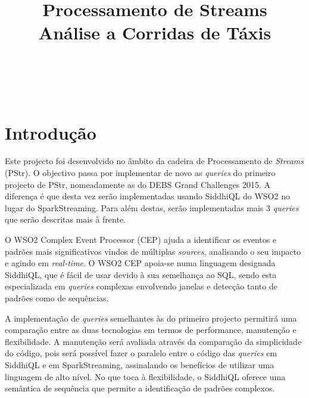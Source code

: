 \documentclass[article]{IEEEtran}
\begin{document}
\title{Processamento de Streams\\Análise a Corridas de Táxis}


\author{\\
\and
{}\\
}

\maketitle



\section{Introdução}
Este projecto foi desenvolvido no âmbito da cadeira de Processamento de \textit{Streams} (PStr). O objectivo passa por implementar de novo as \textit{queries} do primeiro projecto de PStr, nomeadamente as do  DEBS Grand Challenges 2015. A diferença é que desta vez serão implementadas usando SiddhiQL do WSO2 no lugar do SparkStreaming. Para além destas, serão implementadas mais 3 \textit{queries} que serão descritas mais à frente.

O WSO2 Complex Event Processor (CEP) ajuda a identificar os eventos e padrões mais significativos vindos de múltiplas \textit{sources}, analisando o seu impacto e agindo em \textit{real-time}. O WSO2 CEP apoia-se numa linguagem designada SiddhiQL, que é fácil de usar devido à sua semelhança ao SQL, sendo esta especializada em \textit{queries} complexas envolvendo janelas e detecção tanto de padrões como de sequências.


A implementação de \textit{queries} semelhantes às do primeiro projecto permitirá uma comparação entre as duas tecnologias em termos de performance, manutenção e flexibilidade. A manutenção será avaliada através da comparação da simplicidade do código, pois será possível fazer o paralelo entre o código das \textit{queries} em SiddhiQL e em SparkStreaming, assinalando os benefícios de utilizar uma linguagem de alto nível. No que toca à flexibilidade, o SiddhiQL oferece uma semântica de sequência que permite a identificação de padrões complexos.

	
	
\end{document}
